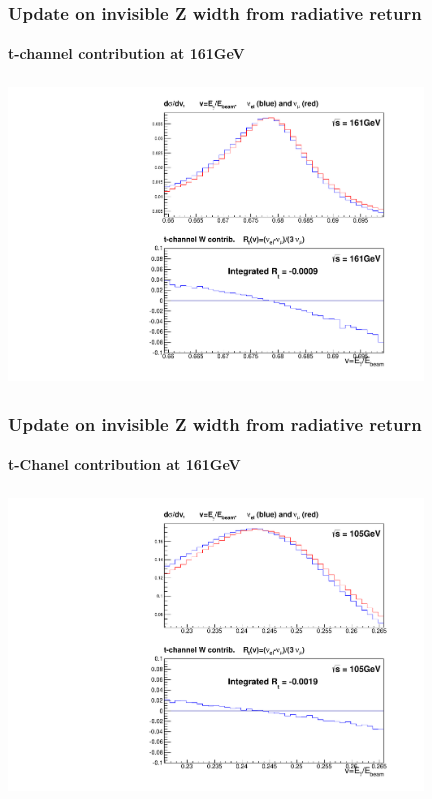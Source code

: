 \documentclass{beamer}
\begin{document}
\begin{frame}[fragile]
\frametitle{\bf Update on invisible Z width from radiative return}
\framesubtitle{\bf\large t-channel contribution at 161GeV}

\includegraphics[width=110mm,height=80mm]{./cNuDiff_E161.pdf}
\end{frame}

\begin{frame}[fragile]
\frametitle{\bf Update on invisible Z width from radiative return}
\framesubtitle{\bf\large t-Chanel contribution at 161GeV}

\includegraphics[width=110mm,height=80mm]{./cNuDiff_E105.pdf}
\end{frame}
\end{document}
